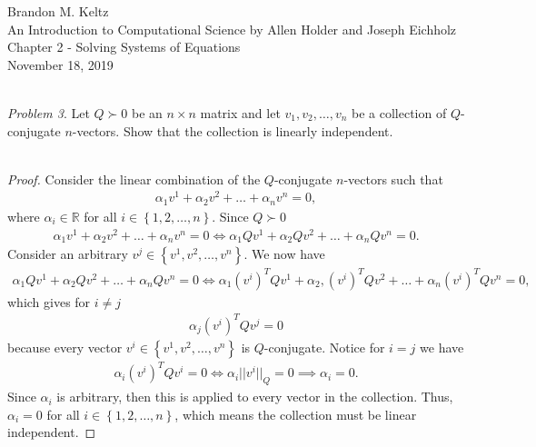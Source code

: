 \documentclass{article}
\begin{document}
	
	\begin{flushleft}	
	
		Brandon M. Keltz\\
		An Introduction to Computational Science by Allen Holder and Joseph Eichholz\\
		Chapter 2 - Solving Systems of Equations\\
		November 18, 2019\\\
		
		\textit{Problem 3}. Let $Q \succ 0$ be an $n \times n$ matrix and let $v_1, v_2, \ldots, v_n$ be a collection of $Q$-conjugate $n$-vectors. Show that the collection is linearly independent. \\\
		
		\begin{proof}
		
			Consider the linear combination of the $Q$-conjugate $n$-vectors such that
			\begin{align*}
				\alpha_1 v^1 + \alpha_2 v^2 + \ldots + \alpha_n v^n = 0,
			\end{align*}
			where $\alpha_i \in \mathbb{R}$ for all $i \in \left\{ 1, 2, \ldots, n \right\}$. Since $Q \succ 0$
			\begin{align*}
				\alpha_1 v^1 + \alpha_2 v^2 + \ldots + \alpha_n v^n = 0 \iff \alpha_1 Q v^1 + \alpha_2 Q v^2 + \ldots + \alpha_n Q v^n = 0.
			\end{align*}
			Consider an arbitrary $v^j \in \left\{ v^1, v^2, \ldots, v^n \right\}$. We now have 
			\begin{align*}
				\alpha_1 Q v^1 + \alpha_2 Q v^2 + \ldots + \alpha_n Q v^n = 0 \iff \alpha_1 \left( v^i \right)^T Q v^1 + \alpha_2, \left( v^i \right)^T Q v^2 + \ldots + \alpha_n \left( v^i \right)^T Q v^n = 0,
			\end{align*}
			which gives for $i \neq j$
			\begin{align*}
				\alpha_j \left( v^i \right)^T Q v^j = 0
			\end{align*}
			because every vector $v^i \in \left\{ v^1, v^2, \ldots, v^n \right\}$ is $Q$-conjugate. Notice for $i = j$ we have
			\begin{align*}
				\alpha_i \left( v^i \right)^T Q v^i = 0 \iff \alpha_i ||v^i||_Q = 0 \implies \alpha_i = 0.
			\end{align*}
			Since $\alpha_i$ is arbitrary, then this is applied to every vector in the collection. Thus, $\alpha_i = 0$ for all $i \in \left\{ 1, 2, \ldots, n \right\}$, which means the collection must be linear independent. 
		
		\end{proof}
	
	\end{flushleft}
	
\end{document}
